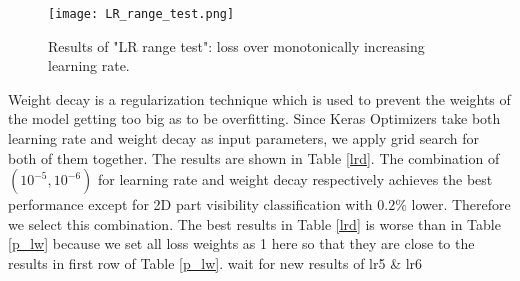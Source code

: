 \begin{figure}[H]		
	\texttt{[image: LR\_range\_test.png]}
	\caption{Results of "LR range test": loss over monotonically increasing learning rate. }
	\centering
	\label{figure:lr_test}
\end{figure}

Weight decay is a regularization technique which is used to prevent the weights of the model getting too big as to be overfitting. Since Keras Optimizers \cite{chollet2015keras} take both learning rate and weight decay as input parameters, we apply grid search for both of them together. The results are shown in Table \ref{lrd}. The combination of $(10^{-5}, 10^{-6})$ for learning rate and weight decay respectively achieves the best performance except for 2D part visibility classification with $0.2\%$ lower. Therefore we select this combination. The best results in Table \ref{lrd} is worse than in Table \ref{p_lw} because we set all loss weights as 1 here so that they are close to the results in first row of Table \ref{p_lw}. \tbd wait for new results of lr5 \& lr6


